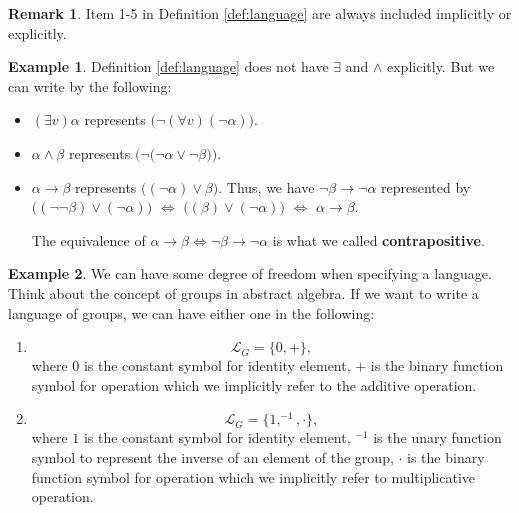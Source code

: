 \documentclass[11pt,letterpaper]{book}
\theoremstyle{definition}
\newtheorem{remark}{Remark}[section]
\newtheorem{example}{Example}[section]
\begin{document}
\begin{remark}
Item 1-5 in Definition \ref{def:language} are always included implicitly
or explicitly.

\end{remark}

\begin{example}\label{example:language_extention}
Definition \ref{def:language} does not have $\exists$ and $\land$
explicitly. But we can write by the following:
\begin{itemize}
\item{$(\exists v) \alpha$ represents $ \Big( \lnot (\forall v) ( \lnot
\alpha ) \Big) $.}
\item{$\alpha \land \beta$ represents $ \Big( \lnot \big( \lnot \alpha
\lor \lnot \beta \big)  \Big) $.}
\item{$\alpha \rightarrow \beta$ represents $ \Big(  (\lnot \alpha)\lor
\beta \Big) $. Thus, we have $\lnot \beta \rightarrow \lnot \alpha $
represented by $ \Big( (\lnot \lnot \beta ) \lor (\lnot \alpha) \Big) $
$\iff $ $ \Big( ( \beta ) \lor (\lnot \alpha) \Big)$ $ \iff $ $ \alpha
\rightarrow \beta$.

The equivalence of $\alpha \rightarrow \beta \iff \lnot \beta
\rightarrow \lnot \alpha$ is what we called \textbf{contrapositive}.

}

\end{itemize}

\end{example}
%
%

\begin{example}
We can have some degree of freedom when specifying a language. Think
about the concept of groups in abstract algebra. If we want to write a
language of groups, we can have either one in the following:
\begin{enumerate}
\item{$$ \mathcal{L}_{G} = \{ 0, + \} , $$
where $0$ is the constant symbol for identity element, $+$ is the binary
function symbol for operation which we implicitly refer to the additive
operation.
}
\item{$$ \mathcal{L}_{G} = \{1, ^{-1}, \cdot \} ,$$
where $1$ is the constant symbol for identity element, $^{-1}$ is the
unary function symbol to represent the inverse of an element of the
group, $\cdot$ is the binary function symbol for operation which we
implicitly refer to multiplicative operation.
}
\end{enumerate}


\end{example}
\end{document}
